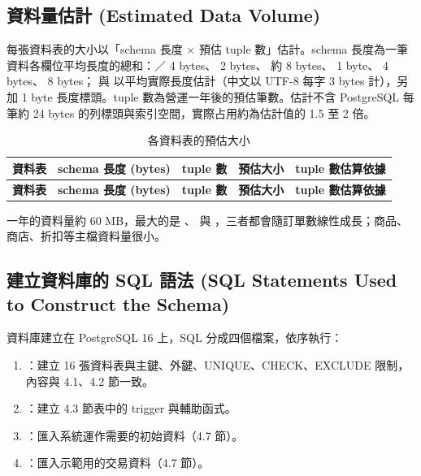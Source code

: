 \subsection{資料量估計 (Estimated Data Volume)}

每張資料表的大小以「schema 長度 × 預估 tuple 數」估計。schema 長度為一筆資料各欄位平均長度的總和：／ 4 bytes、 2 bytes、 約 8 bytes、 1 byte、 4 bytes、 8 bytes； 與  以平均實際長度估計（中文以 UTF-8 每字 3 bytes 計），另加 1 byte 長度標頭。tuple 數為營運一年後的預估筆數。估計不含 PostgreSQL 每筆約 24 bytes 的列標頭與索引空間，實際占用約為估計值的 1.5 至 2 倍。

\begingroup\small
\begin{xltabular}{\linewidth}{|>{\raggedright\arraybackslash}p{3.3cm}|>{\raggedleft\arraybackslash}p{1.9cm}|>{\raggedleft\arraybackslash}p{1.8cm}|>{\raggedleft\arraybackslash}p{1.9cm}|>{\raggedright\arraybackslash}X|}
\caption{各資料表的預估大小}\\
\hline{}\textbf{資料表} & \textbf{schema 長度 (bytes)} & \textbf{tuple 數} & \textbf{預估大小} & \textbf{tuple 數估算依據}\\\hline\endfirsthead
\hline{}\textbf{資料表} & \textbf{schema 長度 (bytes)} & \textbf{tuple 數} & \textbf{預估大小} & \textbf{tuple 數估算依據}\\\hline\endhead

\end{xltabular}
\endgroup

一年的資料量約 60 MB，最大的是 、 與 ，三者都會隨訂單數線性成長；商品、商店、折扣等主檔資料量很小。

\clearpage
\subsection{建立資料庫的 SQL 語法 (SQL Statements Used to Construct the Schema)}

資料庫建立在 PostgreSQL 16 上，SQL 分成四個檔案，依序執行：

\begin{enumerate}[itemsep=0.2em]
  \item {}：建立 16 張資料表與主鍵、外鍵、UNIQUE、CHECK、EXCLUDE 限制，內容與 4.1、4.2 節一致。
  \item {}：建立 4.3 節表中的 trigger 與輔助函式。
  \item {}：匯入系統運作需要的初始資料（4.7 節）。
  \item {}：匯入示範用的交易資料（4.7 節）。
\end{enumerate}

